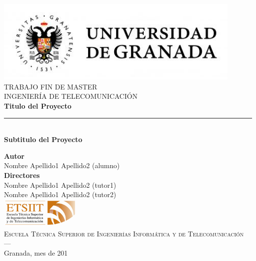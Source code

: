 \begin{titlepage}


\newlength{\centeroffset}
\setlength{\centeroffset}{-0.5\oddsidemargin}
\addtolength{\centeroffset}{0.5\evensidemargin}
\thispagestyle{empty}

\noindent\hspace*{\centeroffset}\begin{minipage}{\textwidth}

\centering
\includegraphics[width=0.9\textwidth]{imagenes/logo_ugr.jpg}\\[1.4cm]

\textsc{ \Large TRABAJO FIN DE MASTER\\[0.2cm]}
\textsc{ INGENIERÍA DE TELECOMUNICACIÓN}\\[1cm]
%
{\Huge\bfseries Titulo del Proyecto\\
}
\noindent\rule[-1ex]{\textwidth}{3pt}\\[3.5ex]
{\large\bfseries Subtitulo del Proyecto}
\end{minipage}

\vspace{2.5cm}
\noindent\hspace*{\centeroffset}\begin{minipage}{\textwidth}
\centering

\textbf{Autor}\\ {Nombre Apellido1 Apellido2 (alumno)}\\[2.5ex]
\textbf{Directores}\\
{Nombre Apellido1 Apellido2 (tutor1)\\
Nombre Apellido1 Apellido2 (tutor2)}\\[2cm]
\includegraphics[width=0.3\textwidth]{imagenes/etsiit_logo.png}\\[0.1cm]
\textsc{Escuela Técnica Superior de Ingenierías Informática y de Telecomunicación}\\
\textsc{---}\\
Granada, mes de 201
\end{minipage}
\end{titlepage}


